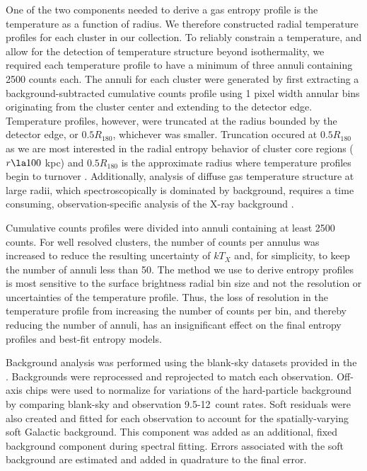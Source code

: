 \documentclass[apj]{emulateapj}
\begin{document}
One of the two components needed to derive a gas entropy profile is
the temperature as a function of radius. We therefore constructed
radial temperature profiles for each cluster in our collection. To
reliably constrain a temperature, and allow for the detection of
temperature structure beyond isothermality, we required each
temperature profile to have a minimum of three annuli containing 2500
counts each. The annuli for each cluster were generated by first
extracting a background-subtracted cumulative counts profile using 1
pixel width annular bins originating from the cluster center and
extending to the detector edge. Temperature profiles, however, were
truncated at the radius bounded by the detector edge, or $0.5
R_{180}$, whichever was smaller. Truncation occured at $0.5 R_{180}$
as we are most interested in the radial entropy behavior of cluster
core regions ($r \la 100$ kpc) and $0.5 R_{180}$ is the approximate
radius where temperature profiles begin to turnover
\citep{2005ApJ...628..655V}.  Additionally, analysis of diffuse gas
temperature structure at large radii, which spectroscopically is
dominated by background, requires a time consuming,
observation-specific analysis of the X-ray background \cite[see][for a
  detailed discussion on this point]{minggroups}.

Cumulative counts profiles were divided into annuli containing at
least 2500 counts. For well resolved clusters, the number of counts
per annulus was increased to reduce the resulting uncertainty of
$kT_X$ and, for simplicity, to keep the number of annuli less than
50. The method we use to derive entropy profiles is most sensitive to
the surface brightness radial bin size and not the resolution or
uncertainties of the temperature profile. Thus, the loss of resolution
in the temperature profile from increasing the number of counts per
bin, and thereby reducing the number of annuli, has an insignificant
effect on the final entropy profiles and best-fit entropy models.

Background analysis was performed using the blank-sky datasets
provided in the \caldb. Backgrounds were reprocessed and reprojected
to match each observation. Off-axis chips were used to normalize for
variations of the hard-particle background by comparing blank-sky and
observation 9.5-12\keV\ count rates. Soft residuals were also created
and fitted for each observation to account for the spatially-varying
soft Galactic background. This component was added as an additional,
fixed background component during spectral fitting. Errors associated
with the soft background are estimated and added in quadrature to the
final error.
\end{document}
